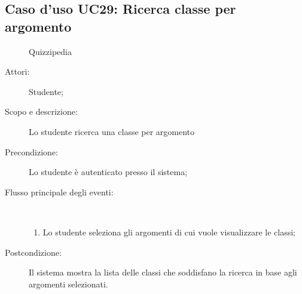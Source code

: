 \subsection{Caso d'uso UC29: Ricerca classe per argomento}
	\begin{figure}[H]
		\centering
		\begin{resizedtikzpicture}{\textwidth}
		\begin{umlsystem}[x=0, fill=lightgray!20]{Quizzipedia}
		\end{umlsystem}
		\end{resizedtikzpicture}
		\caption{}
	\end{figure}
\begin{description}
\item[Attori:] Studente;
\item[Scopo e descrizione:] Lo studente ricerca una classe per argomento
      \item[Precondizione:] Lo studente è autenticato presso il sistema;

        \item[Flusso principale degli eventi:] \ 
 \begin{enumerate}
          \item Lo studente seleziona gli argomenti di cui vuole visualizzare le classi;

      \end{enumerate}
    \item[Postcondizione:] Il sistema mostra la lista delle classi che soddisfano la ricerca in base agli argomenti selezionati.
  \end{description}
\hypertarget{UC30}{}

